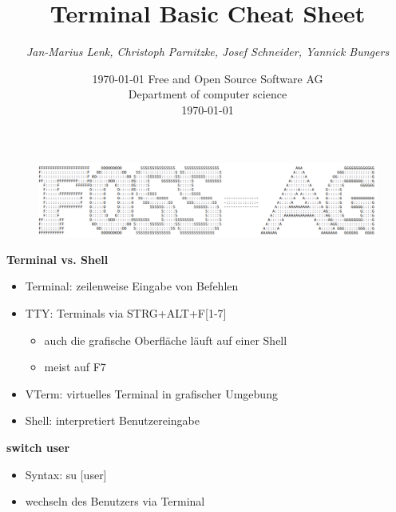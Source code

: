 \documentclass[12pt,utf8, 10pt]{article}
\newcommand\svthema{Terminal Basic Cheat Sheet}
\newcommand\svperson{Jan-Marius Lenk, Christoph Parnitzke, Josef Schneider, Yannick Bungers}
\newcommand\svdatum{\today}
\newcommand\lvinst{Free and Open Source Software AG\\ Department of computer science}
\begin{document}
\date{\today}
\title{ \textbf{\color{blue}\svthema} }
\author{ \textsl{\color{black}\svperson} }
\date{ \small \lvinst \\ \svdatum}


\begin{figure}
\includegraphics[scale=0.35]{foss-ag.png}
\end{figure}

\maketitle


\small
\textbf{Terminal vs. Shell}
\begin{itemize}
	\item Terminal: zeilenweise Eingabe von Befehlen
	\item TTY: Terminals via STRG+ALT+F[1-7]
	\begin{itemize}
		\item auch die grafische Oberfläche läuft auf einer Shell
		\item meist auf F7
	\end{itemize}
	\item VTerm: virtuelles Terminal in grafischer Umgebung
	\item Shell: interpretiert Benutzereingabe
\end{itemize}

\textbf{switch user}
\begin{itemize}
	\item Syntax: su [user]
	\item wechseln des Benutzers via Terminal
\end{itemize}
\end{document}
